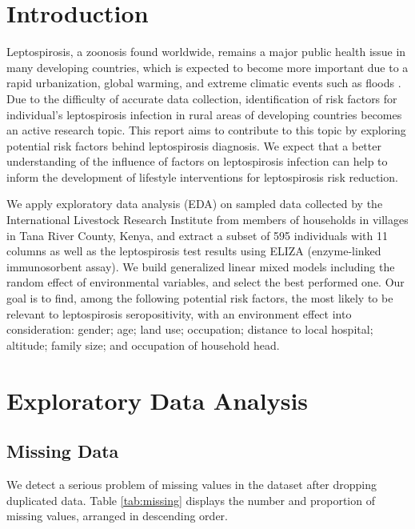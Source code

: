 \documentclass[11pt,twoside]{article}
\numberwithin{Theorem}{section}
\numberwithin{Definition}{section}
\numberwithin{Lemma}{section}
\numberwithin{Algorithm}{section}
\numberwithin{equation}{section}
\begin{document}
\nocite{*}

\clearpage

\section{Introduction}
\label{sec:intro}

Leptospirosis, a zoonosis found worldwide, remains a major public health issue in many developing countries, which is expected to become more important due to a rapid urbanization, global warming, and extreme climatic events such as floods \cite{picardeau2013diagnosis}. Due to the difficulty of accurate data collection, identification of risk factors for individual's leptospirosis infection in rural areas of developing countries becomes an active research topic. This report aims to contribute to this topic by exploring potential risk factors behind leptospirosis diagnosis. We expect that a better understanding of the influence of factors on leptospirosis infection can help to inform the development of lifestyle interventions for leptospirosis risk reduction. 

We apply exploratory data analysis (EDA) on sampled data collected by the International Livestock Research Institute from members of households in villages in Tana River County, Kenya, and extract a subset of 595 individuals with 11 columns as well as the leptospirosis test results using ELIZA (enzyme-linked immunosorbent assay). We build generalized linear mixed models including the random effect of environmental variables, and select the best performed one. Our goal is to find, among the following potential risk factors, the most likely to be relevant to leptospirosis seropositivity, with an environment effect into consideration: gender; age; land use; occupation; distance to local hospital; altitude; family size; and occupation of household head.

\section{Exploratory Data Analysis}  
\label{sec: EDA}

\subsection{Missing Data}

We detect a serious problem of missing values in the dataset after dropping duplicated data. Table \ref{tab:missing} displays the number and proportion of missing values, arranged in descending order. 
\end{document}
